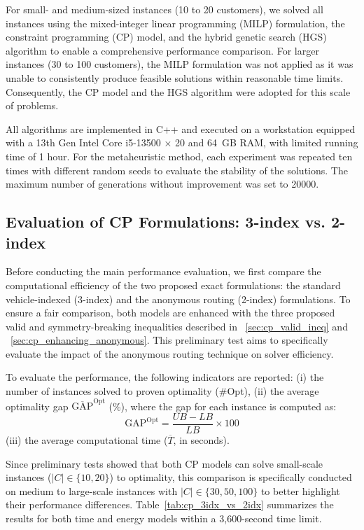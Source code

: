 \documentclass[3p, authoryear, 11pt]{elsarticle}
\begin{document}
For small- and medium-sized instances (10 to 20 customers), we solved all instances using the mixed-integer linear programming (MILP) formulation, the constraint programming (CP) model, and the hybrid genetic search (HGS) algorithm to enable a comprehensive performance comparison.
For larger instances (30 to 100 customers), the MILP formulation was not applied as it was unable to consistently produce feasible solutions within reasonable time limits. Consequently, the CP model and the HGS algorithm were adopted for this scale of problems.

All algorithms are implemented in C++ and executed on a workstation equipped with a 13th Gen Intel Core i5-13500 × 20 and 64~GB RAM, with limited running time of 1 hour.  
For the metaheuristic method, each experiment was repeated ten times with different random seeds to evaluate the stability of the solutions.  
The maximum number of generations without improvement was set to 20000.
\subsection{Evaluation of CP Formulations: 3-index vs. 2-index}
\label{sec:cp_formulation_comparison}

Before conducting the main performance evaluation, we first compare the computational efficiency of the two proposed exact formulations: the standard vehicle-indexed (3-index) and the anonymous routing (2-index) formulations. To ensure a fair comparison, both models are enhanced with the three proposed valid and symmetry-breaking inequalities described in ~\ref{sec:cp_valid_ineq} and ~\ref{sec:cp_enhancing_anonymous}. This preliminary test aims to specifically evaluate the impact of the anonymous routing technique on solver efficiency.

To evaluate the performance, the following indicators are reported:
(i) the number of instances solved to proven optimality (\#Opt), 
(ii) the average optimality gap $\overline{\mathrm{GAP}}^{\mathrm{Opt}}$ (\%), where the gap for each instance is computed as:
\begin{equation}
    \mathrm{GAP}^{\mathrm{Opt}} = \frac{UB - LB}{LB} \times 100
\end{equation}
(iii) the average computational time ($\overline{T}$, in seconds).

Since preliminary tests showed that both CP models can solve small-scale instances ($|C| \in \{10, 20\}$) to optimality, this comparison is specifically conducted on medium to large-scale instances with $|C| \in \{30, 50, 100\}$ to better highlight their performance differences. Table~\ref{tab:cp_3idx_vs_2idx} summarizes the results for both time and energy models within a 3,600-second time limit.
\end{document}
